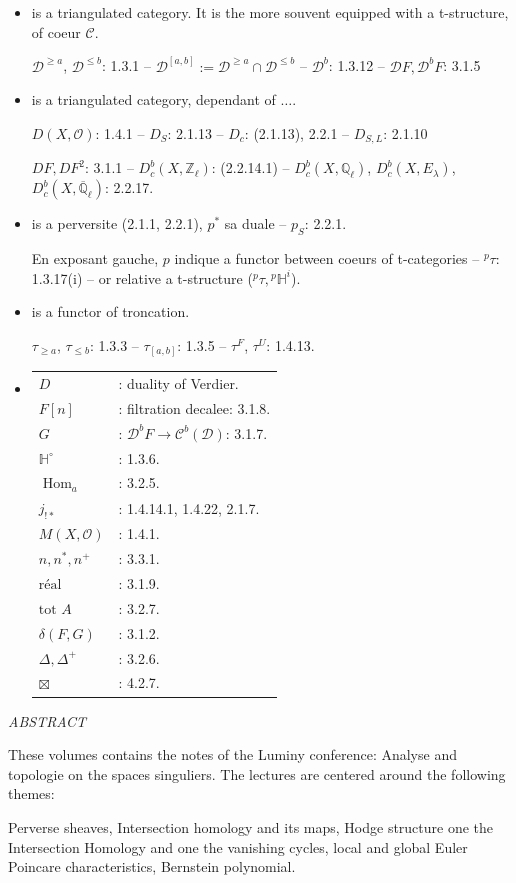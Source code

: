 \documentclass[12pt,a4paper]{article}
\theoremstyle{plain}
\theoremstyle{definition}
\theoremstyle{remark}
\DeclareMathOperator{\Hom}{Hom}
\newcommand{\HH}{\mathbb{H}}
\newcommand{\QQ}{\mathbb{Q}}
\newcommand{\ZZ}{\mathbb{Z}}
\newcommand{\cD}{\mathcal{D}}
\newcommand{\cO}{\mathcal{O}}
\begin{document}
\begin{itemize}
\item[$\cD$] is a triangulated category. It is the more souvent equipped with a t-structure, of coeur $\mathcal{C}$.

$\cD^{\geq a}$, $\cD^{\leq b}$: 1.3.1 -- $\cD^{[a,b]} := \cD^{\geq a} \cap \cD^{\leq b}$ -- $\cD^b$: 1.3.12 -- $\cD F, \cD^b F$: 3.1.5

\item[$\cD(\ldots)$] is a triangulated category, dependant of $\ldots$.

$D(X, \cO)$: 1.4.1 -- $D_S$: 2.1.13 -- $D_c$: (2.1.13), 2.2.1 -- $D_{S,L}$: 2.1.10

$DF, DF^2$: 3.1.1 -- $D^b_c(X, \ZZ_{\ell})$: (2.2.14.1) -- $D^b_c(X, \QQ_{\ell})$, $D^b_c(X, E_{\lambda})$, $D^b_c(X, \overline{\QQ}_{\ell})$: 2.2.17.

\item[$p$] is a perversite (2.1.1, 2.2.1), $p^*$ sa duale -- $p_S$: 2.2.1.

En exposant gauche, $p$ indique a functor between coeurs of t-categories -- ${}^{p}\tau$: 1.3.17(i) -- or relative a t-structure (${}^{p}\tau, {}^{p}\HH^i$).

\item[$\tau$] is a functor of troncation.

$\tau_{\geq a}$, $\tau_{\leq b}$: 1.3.3 -- $\tau_{[a,b]}$: 1.3.5 -- $\tau^F$, $\tau^U$: 1.4.13.

\item[Notation various:]
\begin{tabular}{ll}
$D$ &: duality of Verdier. \\
$F[n]$ &: filtration decalee: 3.1.8. \\
$G$ &: $\cD^b F \to \mathcal{C}^b(\cD)$: 3.1.7. \\
$\HH^\circ$ &: 1.3.6. \\
$\Hom_a$ &: 3.2.5. \\
$j_{!*}$ &: 1.4.14.1, 1.4.22, 2.1.7. \\
$M(X, \cO)$ &: 1.4.1. \\
$n, n^*, n^+$ &: 3.3.1. \\
$\text{r\'eal}$ &: 3.1.9. \\
$\text{tot } A$ &: 3.2.7. \\
$\delta(F, G)$ &: 3.1.2. \\
$\Delta, \Delta^+$ &: 3.2.6. \\
$\boxtimes$ &: 4.2.7.
\end{tabular}
\end{itemize}

\newpage
\begin{center}
\textit{ABSTRACT}
\end{center}

\vspace{1cm}

These volumes contains the notes of the Luminy conference: Analyse and topologie on the spaces singuliers. The lectures are centered around the following themes:

Perverse sheaves, Intersection homology and its maps, Hodge structure one the Intersection Homology and one the vanishing cycles, local and global Euler Poincare characteristics, Bernstein polynomial.
\end{document}
